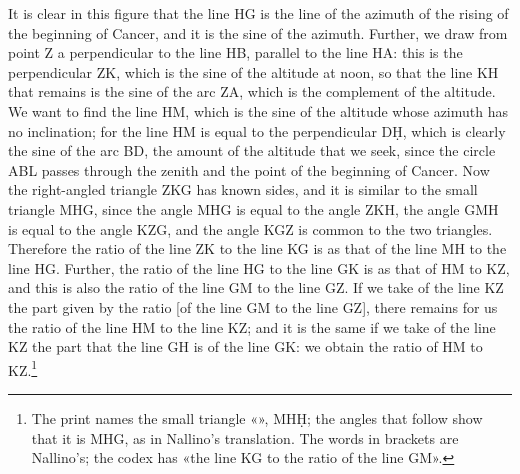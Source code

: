 \documentclass[11pt]{article}
\newcommand{\ArPage}[1]{\marginpar{\footnotesize\color{gray}Ar.\,p.\,#1}}
\begin{document}
\par \ArPage{38}It is clear in this figure that the line HG is the line of the azimuth of the rising of the beginning of Cancer, and it is the sine of the azimuth. Further, we draw from point Z a perpendicular to the line HB, parallel to the line HA: this is the perpendicular ZK, which is the sine of the altitude at noon, so that the line KH that remains is the sine of the arc ZA, which is the complement of the altitude. We want to find the line HM, which is the sine of the altitude whose azimuth has no inclination; for the line HM is equal to the perpendicular DḤ, which is clearly the sine of the arc BD, the amount of the altitude that we seek, since the circle ABL passes through the zenith and the point of the beginning of Cancer. Now the right-angled triangle ZKG has known sides, and it is similar to the small triangle MHG, since the angle MHG is equal to the angle ZKH, the angle GMH is equal to the angle KZG, and the angle KGZ is common to the two triangles. Therefore the ratio of the line ZK to the line KG is as that of the line MH to the line HG. Further, the ratio of the line HG to the line GK is as that of HM to KZ, and this is also the ratio of the line GM to the line GZ. If we take of the line KZ the part given by the ratio [of the line GM to the line GZ], there remains for us the ratio of the line HM to the line KZ; and it is the same if we take of the line KZ the part that the line GH is of the line GK: we obtain the ratio of HM to KZ.\footnote{The print names the small triangle «», MHḤ; the angles that follow show that it is MHG, as in Nallino's translation. The words in brackets are Nallino's; the codex has «the line KG to the ratio of the line GM».}\par
\par\begin{center}\end{center}
\end{document}
